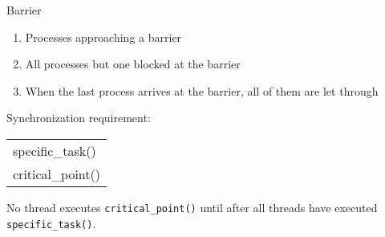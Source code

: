 \begin{frame}
\begin{center}
\end{center}
\end{frame}

\begin{frame}
\begin{center}
\end{center}
\end{frame}

\begin{frame}{Barrier}
  \begin{center}
  \end{center}
  \begin{enumerate}
  \item Processes approaching a barrier
  \item All processes but one blocked at the barrier
  \item When the last process arrives at the barrier, all of them are let through
  \end{enumerate}
  \begin{block}{Synchronization requirement:}
    \begin{center}\ttfamily
      \begin{tabular}{l}
        specific\_task()\\
        critical\_point()
      \end{tabular}
    \end{center}
    No thread executes \texttt{critical\_point()} until after all threads have executed
    \texttt{specific\_task()}.
  \end{block}
\end{frame}

